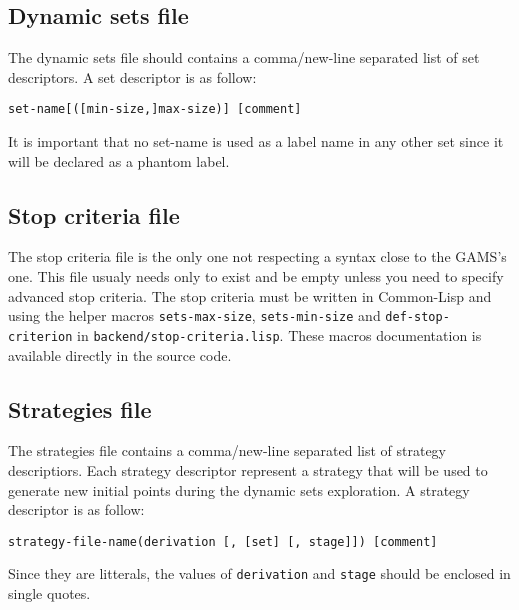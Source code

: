 \subsection*{Dynamic sets file}

The dynamic sets file should contains a comma/new-line separated list of set descriptors.
A set descriptor is as follow:
\begin{center}
  \texttt{set-name[([min-size,]max-size)] [comment]}
\end{center}
It is important that no set-name is used as a label name in any other set since
it will be declared as a phantom label.

\subsection*{Stop criteria file}

The stop criteria file is the only one not respecting a syntax close to the
GAMS's one. This file usualy needs only to exist and be empty unless you need to
specify advanced stop criteria. The stop criteria must be written in Common-Lisp
and using the helper macros \texttt{sets-max-size}, \texttt{sets-min-size} and
\texttt{def-stop-criterion} in \texttt{backend/stop-criteria.lisp}. These macros
documentation is available directly in the source code.

\subsection*{Strategies file}

The strategies file contains a comma/new-line separated list of strategy
descriptiors. Each strategy descriptor represent a strategy that will be used
to generate new initial points during the dynamic sets exploration.
A strategy descriptor is as follow:
\begin{center}
  \texttt{strategy-file-name(derivation [, [set] [, stage]]) [comment]}
\end{center}
Since they are litterals, the values of \texttt{derivation} and \texttt{stage}
should be enclosed in single quotes.

